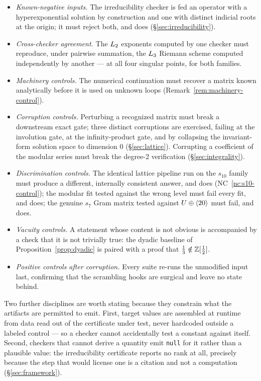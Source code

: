 \begin{itemize}
\item \emph{Known-negative inputs.} The irreducibility checker is fed an
  operator with a hyperexponential solution by construction and one with
  distinct indicial roots at the origin; it must reject both, and does
  (\S\ref{sec:irreducibility}).
\item \emph{Cross-checker agreement.} The $L_2$ exponents computed by one
  checker must reproduce, under pairwise summation, the $L_3$ Riemann
  scheme computed independently by another --- at all four singular points, for
  both families.
\item \emph{Machinery controls.} The numerical continuation must recover a
  matrix known analytically before it is used on unknown loops
  (Remark~\ref{rem:machinery-control}).
\item \emph{Corruption controls.} Perturbing a recognized matrix must break a
  downstream exact gate; three distinct corruptions are exercised, failing at
  the involution gate, at the infinity-product gate, and by collapsing the
  invariant-form solution space to dimension $0$ (\S\ref{sec:lattice}).
  Corrupting a coefficient of the modular series must break the degree-2
  verification (\S\ref{sec:integrality}).
\item \emph{Discrimination controls.} The identical lattice pipeline run on the
  $s_{10}$ family must produce a different, internally consistent answer, and
  does (NC~\ref{nc:s10-control}); the modular fit tested against the wrong
  level must fail every fit, and does; the genuine $s_7$ Gram matrix tested
  against $U\oplus\langle 20\rangle$ must fail, and does.
\item \emph{Vacuity controls.} A statement whose content is not obvious is
  accompanied by a check that it is not trivially true: the dyadic baseline of
  Proposition~\ref{prop:dyadic} is paired with a proof that
  $\tfrac13\notin\mathbb{Z}[\tfrac12]$.
\item \emph{Positive controls after corruption.} Every suite re-runs the
  unmodified input last, confirming that the scrambling hooks are surgical and
  leave no state behind.
\end{itemize}

Two further disciplines are worth stating because they constrain what the
artifacts are permitted to emit. First, target values are assembled at runtime
from data read out of the certificate under test, never hardcoded outside a
labeled control --- so a checker cannot accidentally test a constant against
itself. Second, checkers that cannot derive a quantity emit \texttt{null} for
it rather than a plausible value: the irreducibility certificate reports no
rank at all, precisely because the step that would license one is a citation
and not a computation (\S\ref{sec:framework}).

